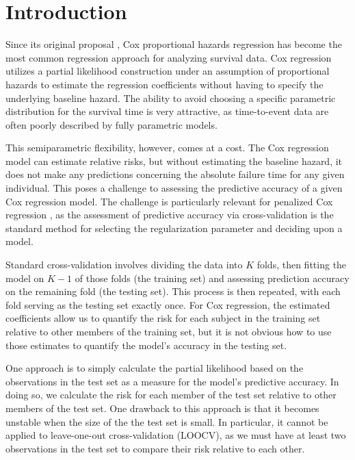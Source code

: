 \section{Introduction}
\par Since its original proposal \citep{Cox1972}, Cox proportional hazards regression has become the most common regression approach for analyzing survival data.  Cox regression utilizes a partial likelihood construction under an assumption of proportional hazards to estimate the regression coefficients without having to specify the underlying baseline hazard.  The ability to avoid choosing a specific parametric distribution for the survival time is very attractive, as time-to-event data are often poorly described by fully parametric models.


This semiparametric flexibility, however, comes at a cost. The Cox regression model can estimate relative risks, but without estimating the baseline hazard, it does not make any predictions concerning the absolute failure time for any given individual.  This poses a challenge to assessing the predictive accuracy of a given Cox regression model.  The challenge is particularly relevant for penalized Cox regression \citep{Tibshirani1997,Fan2002}, as the assessment of predictive accuracy via cross-validation is the standard method for selecting the regularization parameter and deciding upon a model.

\par Standard cross-validation involves dividing the data into $K$ folds, then fitting the model on $K-1$ of those folds (the training set) and assessing prediction accuracy on the remaining fold (the testing set). This process is then repeated, with each fold serving as the testing set exactly once. For Cox regression, the estimated coefficients allow us to quantify the risk for each subject in the training set relative to other members of the training set, but it is not obvious how to use those estimates to quantify the model's accuracy in the testing set.

\par One approach is to simply calculate the partial likelihood based on the observations in the test set as a measure for the model's predictive accuracy.  In doing so, we calculate the risk for each member of the test set relative to other members of the test set.  One drawback to this approach is that it becomes unstable when the size of the the test set is small.  In particular, it cannot be applied to leave-one-out cross-validation (LOOCV), as we must have at least two observations in the test set to compare their risk relative to each other.

